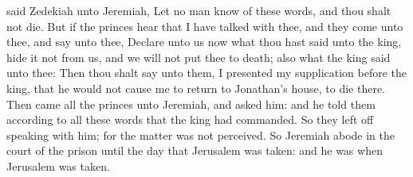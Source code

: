{said
Zedekiah unto
Jeremiah, Let no
man
know of these
words, and thou shalt not
die.
But if the
princes
hear that I have
talked with thee, and they
come unto thee, and
say unto thee,
Declare unto us now what thou hast
said unto the
king,
hide it not from us, and we will not put thee to
death; also what the
king
said unto thee:
Then thou shalt
say unto them, I
presented my
supplication
before the
king, that he would not cause me to
return to
Jonathan’s
house, to
die there.
Then
came all the
princes unto
Jeremiah, and
asked him: and he
told them according to all these
words that the
king had
commanded. So they left off
speaking with him; for the
matter was not
perceived.
So
Jeremiah
abode in the
court of the
prison until the
day that
Jerusalem was
taken: and he was
{} when
Jerusalem was
taken.

}
